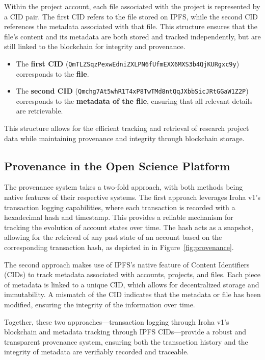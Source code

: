 \documentclass{article}
\begin{document}
Within the project account, each file associated with the project is represented by a CID pair. The first CID refers to the file stored on IPFS, while the second CID references the metadata associated with that file. This structure ensures that the file's content and its metadata are both stored and tracked independently, but are still linked to the blockchain for integrity and provenance.

\begin{itemize}
      \item The \textbf{first CID} (\texttt{QmTLZSqzPexwEdniZXLPN6fUfmEXX6MXS3b4QjKURgxc9y}) corresponds to the \textbf{file}.
      \item The \textbf{second CID} (\texttt{Qmchg7At5whR1T4xP8TwTMd8ntQqJXbbSicJRtGGaW1Z2P}) corresponds to the \textbf{metadata of the file}, ensuring that all relevant details are retrievable.
\end{itemize}

This structure allows for the efficient tracking and retrieval of research project data while maintaining provenance and integrity through blockchain storage.

\subsection{Provenance in the Open Science Platform}

The provenance system takes a two-fold approach, with both methods being native features of their respective systems. The first approach leverages Iroha v1’s transaction logging capabilities, where each transaction is recorded with a hexadecimal hash and timestamp. This provides a reliable mechanism for tracking the evolution of account states over time. The hash acts as a snapshot, allowing for the retrieval of any past state of an account based on the corresponding transaction hash, as depicted in in Figure~\ref{fig:provenance}.

The second approach makes use of IPFS’s native feature of Content Identifiers (CIDs) to track metadata associated with accounts, projects, and files. Each piece of metadata is linked to a unique CID, which allows for decentralized storage and immutability. A mismatch of the CID indicates that the metadata or file has been modified, ensuring the integrity of the information over time.

Together, these two approaches—transaction logging through Iroha v1’s blockchain and metadata tracking through IPFS CIDs—provide a robust and transparent provenance system, ensuring both the transaction history and the integrity of metadata are verifiably recorded and traceable.
\end{document}

